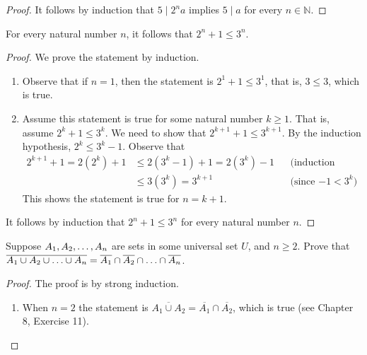 \documentclass[DIN, pagenumber=false, fontsize=11pt, parskip=half]{scrartcl}
\begin{document}
\begin{problems}
\begin{proof}
        It follows by induction that $5 \mid 2^{n}a$ implies $5 \mid a$ for every $n \in \mathbb{N}$.
    \end{proof}

    \problem For every natural number $n$, it follows that $2^{n} + 1 \leq 3^n$.
    \begin{proof}
        We prove the statement by induction.
        \begin{enumerate}
            \item Observe that if $n=1$, then the statement is $2^1+1 \leq 3^1$, that is, $3 \leq 3$, which is true.

            \item Assume this statement is true for some natural number $k \geq 1$.
                That is, assume $2^k+1 \leq 3^k$.
                We need to show that $2^{k+1}+1 \leq 3^{k+1}$.
                By the induction hypothesis, $2^k \leq 3^k - 1$. Observe that
                \begin{align*}
                    2^{k+1} + 1 = 2(2^k) + 1 & \leq 2(3^k - 1) + 1 = 2(3^k) - 1 && \text{(induction hypothesis)}\\
                                             & \leq 3(3^k) = 3^{k+1} && \text{(since $-1 < 3^k$)}
                \end{align*}
                This shows the statement is true for $n = k + 1$.
        \end{enumerate}

        It follows by induction that $2^n+1 \leq 3^n$ for every natural number $n$.
    \end{proof}

    \problem Suppose $A_1, A_2, \mathellipsis, A_n$ are sets in some universal set $U$, and $n \geq 2$. Prove that $\overline{A_1 \cup A_2 \cup \mathellipsis \cup A_n} = \overline{A_1} \cap \overline{A_2} \cap \mathellipsis \cap \overline{A_n}$.
    \begin{proof}
        The proof is by strong induction.
        \begin{enumerate}
            \item When $n=2$ the statement is $\overline{A_1 \cup A_2} = \overline{A_1} \cap \overline{A_2}$, which is true (see Chapter 8, Exercise 11).


\end{enumerate}
\end{proof}
\end{problems}
\end{document}
